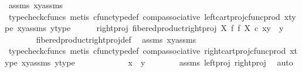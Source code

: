 \begin{isabellebody}
\ assms\ xy{\isacharunderscore}{\kern0pt}assms\isanewline
\ \ \ \ \ \ \isamarkupfalse%
\ {\isacharparenleft}{\kern0pt}typecheck{\isacharunderscore}{\kern0pt}cfuncs{\isacharcomma}{\kern0pt}\ metis\ cfunc{\isacharunderscore}{\kern0pt}type{\isacharunderscore}{\kern0pt}def\ comp{\isacharunderscore}{\kern0pt}associative\ left{\isacharunderscore}{\kern0pt}cart{\isacharunderscore}{\kern0pt}proj{\isacharunderscore}{\kern0pt}cfunc{\isacharunderscore}{\kern0pt}prod\ x{\isacharunderscore}{\kern0pt}type{}\ xy{\isacharunderscore}{\kern0pt}assms{\isacharparenleft}{\kern0pt}{}{\isacharparenright}{\kern0pt}\ y{\isacharunderscore}{\kern0pt}type{}{\isacharparenright}{\kern0pt}\isanewline
\ \ \ \ \isamarkupfalse%
\ right{\isacharunderscore}{\kern0pt}proj{\isacharcolon}{\kern0pt}\ {\isachardoublequoteopen}fibered{\isacharunderscore}{\kern0pt}product{\isacharunderscore}{\kern0pt}right{\isacharunderscore}{\kern0pt}proj\ X\ f\ f\ X\ {\isasymcirc}\isactrlsub c\ xy\ {\isacharequal}{\kern0pt}\ y{\isachardoublequoteclose}\isanewline
\ \ \ \ \ \ \isamarkupfalse%
\ fibered{\isacharunderscore}{\kern0pt}product{\isacharunderscore}{\kern0pt}right{\isacharunderscore}{\kern0pt}proj{\isacharunderscore}{\kern0pt}def\ \isamarkupfalse%
\ assms\ xy{\isacharunderscore}{\kern0pt}assms\isanewline
\ \ \ \ \ \ \isamarkupfalse%
\ {\isacharparenleft}{\kern0pt}typecheck{\isacharunderscore}{\kern0pt}cfuncs{\isacharcomma}{\kern0pt}\ metis\ cfunc{\isacharunderscore}{\kern0pt}type{\isacharunderscore}{\kern0pt}def\ comp{\isacharunderscore}{\kern0pt}associative\ right{\isacharunderscore}{\kern0pt}cart{\isacharunderscore}{\kern0pt}proj{\isacharunderscore}{\kern0pt}cfunc{\isacharunderscore}{\kern0pt}prod\ x{\isacharunderscore}{\kern0pt}type{}\ xy{\isacharunderscore}{\kern0pt}assms{\isacharparenleft}{\kern0pt}{}{\isacharparenright}{\kern0pt}\ y{\isacharunderscore}{\kern0pt}type{}{\isacharparenright}{\kern0pt}\isanewline
\ \ \ \ \ \ \isanewline
\ \ \ \ \isamarkupfalse%
\ {\isachardoublequoteopen}x\ {\isacharequal}{\kern0pt}\ y{\isachardoublequoteclose}\isanewline
\ \ \ \ \ \ \isamarkupfalse%
\ assms{\isacharparenleft}{\kern0pt}{}{\isacharparenright}{\kern0pt}\ left{\isacharunderscore}{\kern0pt}proj\ right{\isacharunderscore}{\kern0pt}proj\ \isamarkupfalse%
\ auto\isanewline
\ \ \isamarkupfalse%
\isanewline
\ \ \isamarkupfalse%
\ \isamarkupfalse%

\end{isabellebody}
